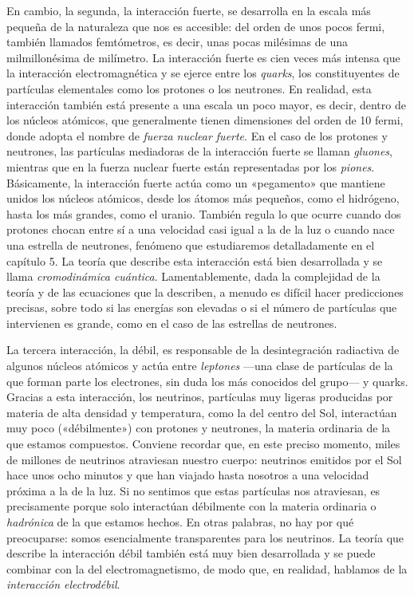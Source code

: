 En cambio, la segunda, la interacción fuerte, se desarrolla en la escala más pequeña
de la naturaleza que nos es accesible: del orden de unos pocos fermi, también llamados
femtómetros, es decir, unas pocas milésimas de una milmillonésima de milímetro. La
interacción fuerte es cien veces más intensa que la interacción electromagnética y
se ejerce entre los \emph{quarks}, los constituyentes de partículas elementales como
los protones o los neutrones. En realidad, esta interacción también está presente a
una escala un poco mayor, es decir, dentro de los núcleos
atómicos, que generalmente tienen dimensiones del
orden de 10 fermi, donde adopta el nombre de \emph{fuerza nuclear fuerte}. En el caso
de los protones y neutrones, las partículas mediadoras de la interacción fuerte se
llaman \emph{gluones}, mientras que en la fuerza nuclear fuerte están
representadas por los \emph{piones}. Básicamente, la interacción fuerte
actúa como un «pegamento» que mantiene unidos los núcleos atómicos, desde los átomos
más pequeños, como el hidrógeno, hasta los más grandes, como el uranio. También regula
lo que ocurre cuando dos protones chocan entre sí a una velocidad casi igual a la de
la luz o cuando nace una estrella de neutrones, fenómeno
que estudiaremos detalladamente en el capítulo 5. La teoría que describe esta
interacción está bien desarrollada y se llama \emph{cromodinámica
cuántica}. Lamentablemente, dada
la complejidad de la teoría y de las ecuaciones que la describen, a menudo es difícil
hacer predicciones precisas, sobre todo si las energías son elevadas o si el número
de partículas que intervienen es grande, como en el caso de las estrellas de neutrones.

La tercera interacción, la débil, es responsable de la desintegración radiactiva de
algunos núcleos atómicos y actúa entre \emph{leptones} ---una clase
de partículas de la que forman parte los electrones, sin
duda los más conocidos del grupo--- y quarks. Gracias a esta interacción, los
neutrinos, partículas muy ligeras producidas por materia de alta
densidad y temperatura, como la del centro del Sol, interactúan muy poco
(«débilmente») con protones y neutrones, la materia ordinaria de la que estamos
compuestos. Conviene recordar que, en este preciso momento, miles de millones de
neutrinos atraviesan nuestro cuerpo: neutrinos emitidos por el Sol hace unos ocho
minutos y que han viajado hasta nosotros a una velocidad próxima a la de la luz.
Si no sentimos que estas partículas nos atraviesan, es precisamente porque solo
interactúan débilmente con la materia ordinaria o \emph{hadrónica}
de la que estamos hechos. En otras palabras, no hay por qué preocuparse: somos
esencialmente transparentes para los neutrinos. La teoría que describe la interacción
débil también está muy bien desarrollada y se puede combinar con la del
electromagnetismo, de modo que, en realidad, hablamos de la \emph{interacción electrodébil}.

